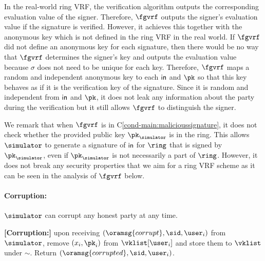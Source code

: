 \begin{tcolorbox}[left=2pt,right=2pt]
	\end{tcolorbox}
	
	In the real-world ring VRF, the verification algorithm outputs the corresponding evaluation value of the signer. Therefore, $ \fgvrf $  outputs the signer's evaluation value if the signature is verified. However, it achieves this together with the anonymous key which is not defined in the ring VRF in the real world.  If $ \fgvrf $ did not define an anonymous key for  each signature, then there would be no way that $ \fgvrf $ determines the signer's key and outputs the evaluation value because $ \sigma $ does not need to be unique for each key. Therefore, $ \fgvrf $ maps a random and independent anonymous key to each $ \mathsf{in} $ and $ \pk $ so that this key behaves as if it is the verification key of the signature. Since it  is  random and independent from $ \mathsf{in} $ and $ \pk $, it does not leak any information about the party during the verification but it still allows $ \fgvrf $ to distinguish the signer.
	
	We remark that when $ \fgvrf $ is in C\ref{cond-main:malicioussignature}, it does not check whether the provided public key $ \pk_\simulator $ is in the ring. This allows $\simulator$ to generate a signature of $\mathsf{in}$ for $\ring$ that is signed by $\pk_\simulator$, even if $\pk_\simulator$ is not necessarily a part of $\ring$. However, it does not break any security properties that we aim for a ring VRF scheme as it can be seen in the analysis of $ \fgvrf $ below.
	
	\paragraph{Corruption:} $ \simulator $ can corrupt any honest party at any time.  
	
	\begin{tcolorbox}[left=2pt,right=2pt]
		\eprint{}{\small}
		\textbf{[Corruption:] } 
		upon receiving $ (\oramsg{corrupt}, \sid, \user_i) $ from $ \simulator $, remove $ (x_i,\pk_i) $ from $ \vklist[\user_i] $ and store them to $ \vklist $ under $ \sim $. Return $ (\oramsg{corrupted}, \sid,\user_i) $.
	\end{tcolorbox}
	
